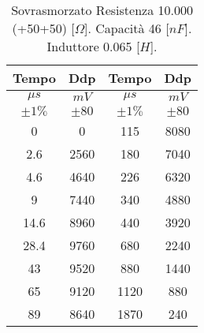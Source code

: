 \begin{table}[H]
\begin{center}
\begin{tabular}{|c|c|c|c|}
\hline
Tempo & Ddp & Tempo & Ddp \\ \hline
$\mu s$ & $mV$ & $\mu s$ & $mV$ \\ \hline
$\pm 1\%$ & $\pm 80$ & $\pm 1\%$ & $\pm 80$ \\ \hline
0 & 0 & 115 & 8080 \\ \hline
2.6 & 2560 & 180 & 7040 \\ \hline
4.6 & 4640 & 226 & 6320 \\ \hline
9 & 7440 & 340 & 4880 \\ \hline
14.6 & 8960 & 440 & 3920 \\ \hline
28.4 & 9760 & 680 & 2240 \\ \hline
43 & 9520 & 880 & 1440 \\ \hline
65 & 9120 & 1120 & 880 \\ \hline
89 & 8640 & 1870 & 240 \\ \hline
\end{tabular}
\end{center}
\caption{Sovrasmorzato
Resistenza 10.000 (+50+50)   [$\Omega$].
Capacità  46    [$nF$].
Induttore 0.065 [$H$].
}
\label{tab:C4_P1_sovra}
\end{table}